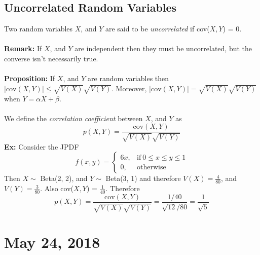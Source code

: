 \documentclass{article}
\newcommand{\ti}[1]{\textit{#1}}
\newcommand{\tb}[1]{\textbf{#1}}
\newcommand{\al}{\alpha}
\newcommand{\be}{\beta}
\newcommand{\prop}{\textbf{Proposition: }}
\newcommand{\exx}{\textbf{Ex: }}
\begin{document}
\subsection{Uncorrelated Random Variables}
Two random variables $X$, and $Y$ are said to be \ti{uncorrelated} if cov($X, Y$) = 0.\\\\
\tb{Remark:} If $X$, and $Y$ are independent then they must be uncorrelated, but the converse isn't necessarily true.\\\\
\prop If $X$, and $Y$ are random variables then $|\text{cov}(X, Y)| \leq \sqrt{V(X)}\sqrt{V(Y)}$. Moreover, $|\text{cov}(X, Y)| = \sqrt{V(X)}\sqrt{V(Y)}$ when $Y = \al X + \be$.\\\\
We define the \ti{correlation coefficient} between $X$, and $Y$ as
\[p(X, Y) = \frac{\text{cov}(X, Y)}{\sqrt{V(X)}\sqrt{V(Y)}}\]
\exx Consider the JPDF
\[
f(x, y) =
\begin{cases}
	6x, &\text{if}\ 0 \leq x \leq y \leq 1\\
	0, &\text{otherwise}
\end{cases}
\]
Then $X \sim$ Beta(2, 2), and $Y \sim$ Beta(3, 1) and therefore $V(X) = \frac{4}{80}$, and $V(Y) = \frac{3}{80}$. Also cov($X, Y$) = $\frac{1}{40}$. Therefore
\[p(X, Y) = \frac{\text{cov}(X, Y)}{\sqrt{V(X)}\sqrt{V(Y)}} = \frac{1/40}{\sqrt{12}/80} = \frac{1}{\sqrt{5}}\]
\newpage


\section{May 24, 2018}
\end{document}
